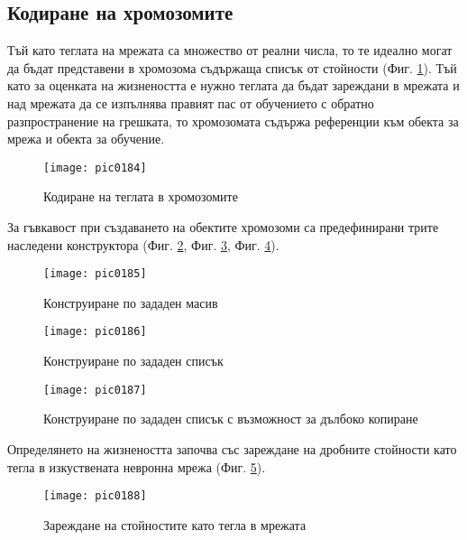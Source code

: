 \subsection{Кодиране на хромозомите}

Тъй като теглата на мрежата са множество от реални числа, то те идеално могат да бъдат представени в хромозома съдържаща списък от стойности (Фиг. \ref{fig:pic0184}). Тъй като за оценката на жизнеността е нужно теглата да бъдат зареждани в мрежата и над мрежата да се изпълнява правият пас от обучението с обратно разпространение на грешката, то хромозомата съдържа референции към обекта за мрежа и обекта за обучение. 

\begin{figure}[h]
  \centering
  \texttt{[image: pic0184]}
  \caption{Кодиране на теглата в хромозомите}
\label{fig:pic0184}
\end{figure}
\FloatBarrier

За гъвкавост при създаването на обектите хромозоми са предефинирани трите наследени конструктора (Фиг. \ref{fig:pic0185}, Фиг. \ref{fig:pic0186}, Фиг. \ref{fig:pic0187}).

\begin{figure}[h]
  \centering
  \texttt{[image: pic0185]}
  \caption{Конструиране по зададен масив}
\label{fig:pic0185}
\end{figure}
\FloatBarrier

\begin{figure}[h]
  \centering
  \texttt{[image: pic0186]}
  \caption{Конструиране по зададен списък}
\label{fig:pic0186}
\end{figure}
\FloatBarrier

\begin{figure}[h]
  \centering
  \texttt{[image: pic0187]}
  \caption{Конструиране по зададен списък с възможност за дълбоко копиране}
\label{fig:pic0187}
\end{figure}
\FloatBarrier

Определянето на жизнеността започва със зареждане на дробните стойности като тегла в изкуствената невронна мрежа (Фиг. \ref{fig:pic0188}).

\begin{figure}[h]
  \centering
  \texttt{[image: pic0188]}
  \caption{Зареждане на стойностите като тегла в мрежата}
\label{fig:pic0188}
\end{figure}
\FloatBarrier

